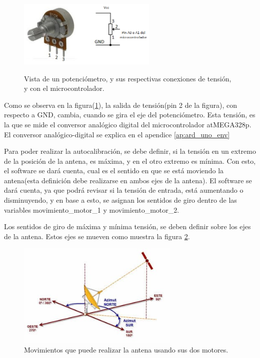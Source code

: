 \begin{figure}
	\centering
	\caption{Vista de un potenciómetro, y sus respectivas conexiones de tensión, y con el microcontrolador.}	
	\includegraphics[height=3.2cm]{pote}
	\label{fig:pot}	
\end{figure}
\vspace{30mm}


Como se observa en la figura(\ref{fig:pot}), la salida de tensión(pin 2 de la figura), con respecto a GND, cambia, cuando se gira el eje del potenciómetro. Esta tensión, es la que se mide el conversor analógico digital del microcontrolador atMEGA328p. El conversor analógico-digital se explica en el apendice \ref{ap:ard_uno_env}   

Para poder realizar la autocalibración, se debe definir, si la tensión en un extremo de la posición de la antena, es máxima, y en el otro extremo es mínima. Con esto, el software se dará cuenta, cual es el sentido en que se está moviendo la antena(esta definición debe realizarse en ambos ejes de la antena). El software se dará cuenta, ya que podrá revisar si la tensión de entrada, está aumentando o disminuyendo, y en base a esto, se asignan los sentidos de giro dentro de las variables movimiento\_motor\_1 y movimiento\_motor\_2. 

Los sentidos de giro de máxima y mínima tensión, se deben definir sobre los ejes de la antena. Estos ejes se mueven como muestra la figura \ref{fig:mov_antena}. 

\begin{figure}[ht]
	\centering
	\includegraphics[height=5cm]{mov_antena}
	\caption{Movimientos que puede realizar la antena usando sus dos motores.}
	\label{fig:mov_antena}	
\end{figure}


